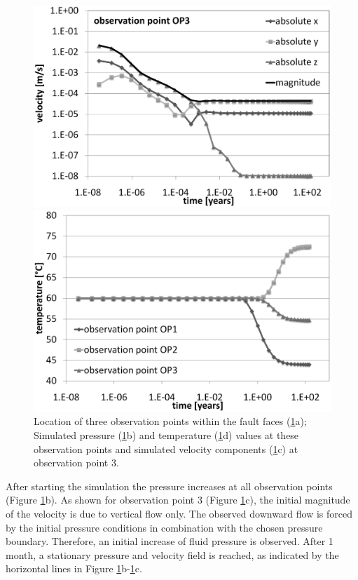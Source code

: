 \begin{figure}[htbp]
\begin{center}
\begin{minipage}{0.40\textwidth}
            \includegraphics[width=1\textwidth]{PART_II/T/2u2f_fig6c.eps}
        \end{minipage}
        \begin{minipage}{0.40\textwidth}
            \includegraphics[width=1\textwidth]{PART_II/T/2u2f_fig6d.eps}
        \end{minipage}
        \caption{Location of three observation points within the fault faces (\ref{fig6}a); Simulated pressure (\ref{fig6}b) and temperature (\ref{fig6}d) values at these observation points and simulated velocity components (\ref{fig6}c) at observation point 3.}
        \label{fig6}
    \end{center}
\end{figure}

After starting the simulation the pressure increases at all observation points (Figure \ref{fig6}b). As shown for observation point 3 (Figure \ref{fig6}c), the initial magnitude of the velocity is due to vertical flow only. The observed downward flow is forced by the initial pressure conditions in combination with the chosen pressure boundary. Therefore, an initial increase of fluid pressure is observed. After 1 month, a stationary pressure and velocity field is reached, as indicated by the horizontal lines in Figure \ref{fig6}b-\ref{fig6}c.


